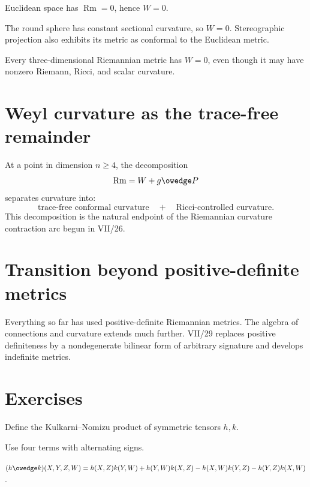 \begin{example}\label{ex:vii28-euclidean}
Euclidean space has \(\operatorname{Rm}=0\), hence \(W=0\).
\end{example}

\begin{example}\label{ex:vii28-sphere}
The round sphere has constant sectional curvature, so \(W=0\).
Stereographic projection also exhibits its metric as conformal to the Euclidean
metric.
\end{example}

\begin{example}\label{ex:vii28-three}
Every three-dimensional Riemannian metric has \(W=0\), even though it may have
nonzero Riemann, Ricci, and scalar curvature.
\end{example}

\section{Weyl curvature as the trace-free remainder}

At a point in dimension \(n\ge4\), the decomposition
\[
\operatorname{Rm}
=
W+g\owedge P
\]
separates curvature into:
\[
\text{trace-free conformal curvature}
\quad+\quad
\text{Ricci-controlled curvature}.
\]
This decomposition is the natural endpoint of the Riemannian curvature contraction
arc begun in VII/26.

\section{Transition beyond positive-definite metrics}

Everything so far has used positive-definite Riemannian metrics.  The algebra of
connections and curvature extends much further.  VII/29 replaces positive
definiteness by a nondegenerate bilinear form of arbitrary signature and develops
indefinite metrics.

\section{Exercises}
\begin{exercise}\label{exr:vii28-01}
Define the Kulkarni--Nomizu product of symmetric tensors \(h,k\).
\end{exercise}
\begin{hint}
Use four terms with alternating signs.
\end{hint}
\begin{solution}
\((h\owedge k)(X,Y,Z,W)=h(X,Z)k(Y,W)+h(Y,W)k(X,Z)-h(X,W)k(Y,Z)-h(Y,Z)k(X,W)\).
\end{solution}


